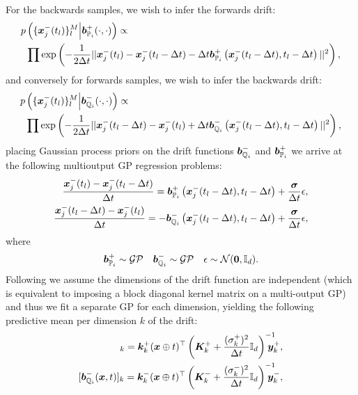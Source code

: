 \documentclass[a4paper,12pt,twoside,openright]{report}
\theoremstyle{definition}
\begin{document}
For the backwards samples, we wish to infer the forwards drift:
\begin{align*}
    p&\left(\{{\bm{x}}^{-}_j(t_l)\}_{l}^M \Big| {\bm{b}}^{+}_{{\mathbb{P}}_{i}}(\cdot, \cdot)\right) \propto\\
    &\prod \exp \left( -\frac{1}{2\Delta t} ||{\bm{x}}^{-}_j(t_l) - {\bm{x}}^{-}_j(t_l - \Delta t) -  \Delta t{\bm{b}}^{+}_{{\mathbb{P}}_{i}}\left({\bm{x}}^{-}_j(t_l - \Delta t), t_l - \Delta t\right) ||^2 \right), 
\end{align*}
and conversely for forwards samples, we wish to infer the backwards drift:
\begin{align*}
    p&\left(\{{\bm{x}}^{-}_j(t_l)\}_{l}^M \Big| {\bm{b}}^{-}_{{\mathbb{Q}}_{i}}(\cdot, \cdot)\right) \propto\\
    &\prod \exp \left( -\frac{1}{2\Delta t} ||{\bm{x}}^{-}_j(t_l - \Delta t)  - {\bm{x}}^{-}_j(t_l)  +  \Delta t{\bm{b}}^{-}_{{\mathbb{Q}}_{i}}\left({\bm{x}}^{-}_j(t_l - \Delta t), t_l - \Delta t\right) ||^2 \right), 
\end{align*}
placing Gaussian process priors on the drift functions ${\bm{b}}^{-}_{{\mathbb{Q}}_{i}}$ and ${\bm{b}}^{+}_{{\mathbb{P}}_{i}}$ we arrive at the following multioutput GP regression problems:
\begin{align*}
        \frac{{\bm{x}}^{-}_j(t_l) - {\bm{x}}^{-}_j(t_l - \Delta t)}{\Delta t} = {\bm{b}}^{+}_{{\mathbb{P}}_{i}}\left({\bm{x}}^{-}_j(t_l - \Delta t), t_l - \Delta t\right) +\frac{\bm{\sigma}}{\Delta t}\epsilon ,\\
        \frac{{\bm{x}}^{-}_j(t_l - \Delta t)  - {\bm{x}}^{-}_j(t_l)}{\Delta t}  = -{\bm{b}}^{-}_{{\mathbb{Q}}_{i}}\left({\bm{x}}^{-}_j(t_l - \Delta t), t_l - \Delta t\right) +\frac{\bm{\sigma}}{\Delta t}\epsilon,
\end{align*}
where
\begin{align}
   {\bm{b}}^{+}_{{\mathbb{P}}_{i}} \sim \mathcal{GP} \quad {\bm{b}}^{-}_{{\mathbb{Q}}_{i}} \sim \mathcal{GP}\quad \epsilon \sim {\mathcal{N}}({\bm{0}}, {\mathbb{I}_d}).
\end{align}
Following \citep{ruttor2013approximate, batz2018approximate} we assume the dimensions of the drift function are independent (which is equivalent to imposing a block diagonal kernel matrix on a multi-output GP) and thus we fit a separate GP for each dimension, yielding the following predictive mean per dimension $k$ of the drift:
\begin{align}
[\bar{\vb}^{+}_{\P_{i}}(\vx, t)]_k = \vk_k^{+}(\vx \oplus t)^{\top} \left(\mK_k^{+} + \frac{(\sigma_k^{+})^2}{\Delta t} \I\right)^{-1}\!\!\!\!\!\!\vy_k^{+}, \\
[\vb^{-}_{\Q_{i}}(\vx, t)]_k = \vk_k^{-}(\vx \oplus t)^{\top} \left(\mK_k^{-} + \frac{(\sigma_k^{-})^2}{\Delta t} \I\right)^{-1}\!\!\!\!\!\!\vy_k^{-} ,
\end{align}
\end{document}
